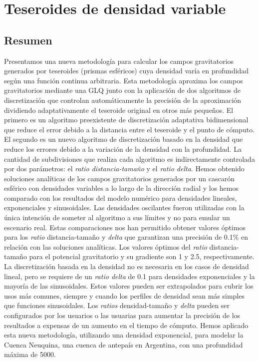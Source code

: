 \chapter{Teseroides de densidad variable}
\label{cha:tesseroids-variable-density}


\section{Resumen}

Presentamos una nueva metodología para calcular los campos gravitatorios
generados por teseroides (prismas esféricos) cuya densidad varía en
profundidad según una función continua arbitraria.
Esta metodología aproxima los campos gravitatorios mediante una \ac{GLQ} junto
con la aplicación de dos algoritmos de discretización que controlan
automáticamente la precisión de la aproximación dividiendo adaptativamente el
teseroide original en otros más pequeños.
El primero es un algoritmo preexistente de discretización adaptativa
bidimensional que reduce el error debido a la distancia entre el teseroide
y el punto de cómputo.
El segundo es un nuevo algoritmo de discretización basado en la densidad que
reduce los errores debido a la variación de la densidad con la profundidad.
La cantidad de subdivisiones que realiza cada algoritmo es indirectamente
controlada por dos parámetros: el \emph{ratio distancia-tamaño} y el
\emph{ratio delta}.
Hemos obtenido soluciones analíticas de los campos gravitatorios generados por
un cascarón esférico con densidades variables a lo largo de la dirección radial
y los hemos comparado con los resultados del modelo numérico para densidades
lineales, exponenciales y sinusoidales.
Las densidades oscilantes fueron utilizadas con la única intención de someter
al algoritmo a sus límites y no para emular un escenario real.
Estas comparaciones nos han permitido obtener valores óptimos para los
\emph{ratio} distancia-tamaño y \emph{delta} que garantizan una precisión de
0.1\% en relación con las soluciones analíticas.
Los valores óptimos del \emph{ratio} distancia-tamaño para el potencial
gravitatorio y su gradiente son 1 y 2.5, respectivamente.
La discretización basada en la densidad no es necesaria en los casos de
densidad lineal, pero se requiere de un \emph{ratio delta} de 0.1 para
densidades exponenciales y la mayoría de las sinusoidales.
Estos valores pueden ser extrapolados para cubrir los usos más comunes, siempre
y cuando los perfiles de densidad sean más simples que funciones sinusoidales.
Los \emph{ratios} densidad-tamaño y \emph{delta} pueden ser configurados
por los usuarios o las usuarias para aumentar la precisión de los resultados
a expensas de un aumento en el tiempo de cómputo.
Hemos aplicado esta nueva metodología, utilizando una densidad exponencial,
para modelar la Cuenca Neuquina, una cuenca de antepaís en Argentina, con una
profundidad máxima de 5000\m{}.


